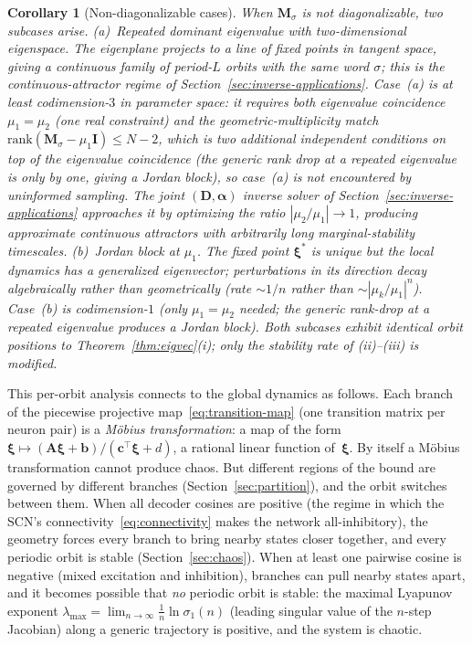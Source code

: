 \documentclass[12pt]{article}
\newcommand{\vv}[1]{\mathbf{#1}}
\newcommand{\xxi}{\boldsymbol{\xi}}
\newtheorem{corollary}{Corollary}
\begin{document}
\begin{corollary}[Non-diagonalizable cases]\label{cor:edge-cases}
When $\vv{M}_\sigma$ is not diagonalizable, two subcases arise. \emph{(a)~Repeated dominant eigenvalue with two-dimensional eigenspace.} The eigenplane projects to a \emph{line of fixed points} in tangent space, giving a continuous family of period-$L$ orbits with the same word $\sigma$; this is the continuous-attractor regime of Section~\ref{sec:inverse-applications}. Case~(a) is at least codimension-$3$ in parameter space: it requires both eigenvalue coincidence $\mu_1=\mu_2$ (one real constraint) and the geometric-multiplicity match $\mathrm{rank}(\vv{M}_\sigma-\mu_1\vv{I})\leq N{-}2$, which is two additional independent conditions on top of the eigenvalue coincidence (the generic rank drop at a repeated eigenvalue is only by one, giving a Jordan block), so case~(a) is not encountered by uninformed sampling. The joint $(\vv{D},\boldsymbol{\alpha})$ inverse solver of Section~\ref{sec:inverse-applications} approaches it by optimizing the ratio $|\mu_2/\mu_1|\to 1$, producing approximate continuous attractors with arbitrarily long marginal-stability timescales.
 \emph{(b)~Jordan block at $\mu_1$.} The fixed point $\xxi^*$ is unique but the local dynamics has a generalized eigenvector; perturbations in its direction decay algebraically rather than geometrically (rate $\sim 1/n$ rather than $\sim|\mu_k/\mu_1|^n$). Case~(b) is codimension-$1$ (only $\mu_1=\mu_2$ needed; the generic rank-drop at a repeated eigenvalue produces a Jordan block). Both subcases exhibit identical orbit positions to Theorem~\ref{thm:eigvec}(i); only the stability rate of (ii)--(iii) is modified.
\end{corollary}


This per-orbit analysis connects to the global dynamics as follows. Each branch of the piecewise projective map~\eqref{eq:transition-map} (one transition matrix per neuron pair) is a \emph{M\"obius transformation}: a map of the form $\xxi\mapsto(\vv{A}\xxi+\vv{b})/(\vv{c}^\top\xxi+d)$, a rational linear function of~$\xxi$. By itself a M\"obius transformation cannot produce chaos. But different regions of the bound are governed by different branches (Section~\ref{sec:partition}), and the orbit switches between them. When all decoder cosines are positive (the regime in which the SCN's connectivity~\eqref{eq:connectivity} makes the network all-inhibitory), the geometry forces every branch to bring nearby states closer together, and every periodic orbit is stable (Section~\ref{sec:chaos}). When at least one pairwise cosine is negative (mixed excitation and inhibition), branches can pull nearby states apart, and it becomes possible that \emph{no} periodic orbit is stable: the maximal Lyapunov exponent $\lambda_{\max}=\lim_{n\to\infty}\frac{1}{n}\ln\sigma_1(n)$ (leading singular value of the $n$-step Jacobian) along a generic trajectory is positive, and the system is chaotic.
\end{document}
